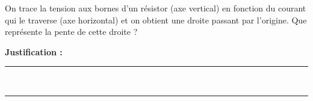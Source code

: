 On trace la tension aux bornes d'un résistor (axe vertical) en fonction du courant qui le traverse (axe horizontal) et on obtient une droite passant par l'origine. Que représente la pente de cette droite ?

\choices

\noindent\textbf{Justification :} \hrulefill \\[2.5ex]
\rule{\linewidth}{0.4pt} \\[2.5ex]
\rule{\linewidth}{0.4pt}
\vfill
